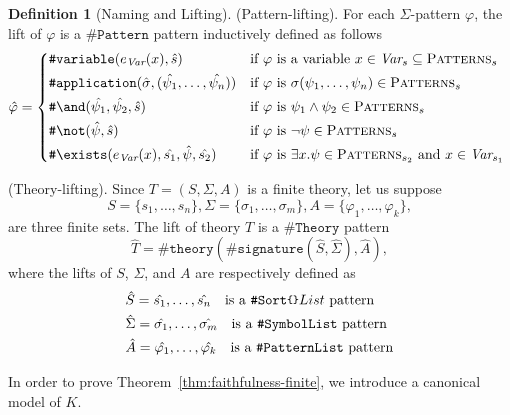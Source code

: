 \documentclass[UTF8,11pt]{article}
\newcounter{thmcounter}
\theoremstyle{plain}
\theoremstyle{definition}
\newtheorem{definition} [thmcounter]{Definition}
\theoremstyle{remark}
\newcommand{\parametric}[2]{{#1}\raisebox{.2ex}{\texttt{\footnotesize{\{}}}#2\raisebox{.2ex}{\texttt{\footnotesize{\}}}}}
\newcommand{\PATTERNS}{\text{P\textsc{atterns}}}
\newcommand{\sharpsymbol}{\#}
\newcommand{\KSort}{\texttt{\sharpsymbol Sort}}
\newcommand{\KPatternList}{\texttt{\sharpsymbol PatternList}}
\newcommand{\KSymbolList}{\texttt{\sharpsymbol SymbolList}}
\newcommand{\KPattern}{\texttt{\sharpsymbol Pattern}}
\newcommand{\Kvariable}{\texttt{\sharpsymbol variable}}
\newcommand{\Kand}{\texttt{\sharpsymbol  \slashsymbol and}}
\newcommand{\Knot}{\texttt{\sharpsymbol  \slashsymbol not}}
\newcommand{\Kapplication}{\texttt{\sharpsymbol application}}
\newcommand{\Kexists}{\texttt{\sharpsymbol \slashsymbol  exists}}
\newcommand{\Ksignature}{\texttt{\sharpsymbol signature}}
\newcommand{\KTheory}{\texttt{\sharpsymbol Theory}}
\newcommand{\Ktheory}{\texttt{\sharpsymbol theory}}
\newcommand{\slashsymbol}{\symbol{92}}
\begin{document}
\begin{definition}[Naming and Lifting]
	(Pattern-lifting).
	For each $\Sigma$-pattern $\varphi$, the lift of $\varphi$ is a $\KPattern$ 
	pattern inductively defined as follows
	\begin{equation*}
	\hat{\varphi} =
	\begin{cases*}
	\Kvariable(e_\Var(x), \hat{s}) & if $\varphi$ is a variable $x \in \Var_s 
	\subseteq \PATTERNS_s$
	\\
	\Kapplication(\hat{\sigma}, (\hat{\psi_1}, \dots, \hat{\psi_n})) & if 
	$\varphi$ is $\sigma(\psi_1,\dots,\psi_n) \in \PATTERNS_s$
	\\
	\Kand(\hat{\psi_1}, \hat{\psi_2}, \hat{s}) & if $\varphi$ is $\psi_1 \wedge 
	\psi_2 \in \PATTERNS_s$
	\\
	\Knot(\hat{\psi}, \hat{s}) & if $\varphi$ is $\neg \psi \in \PATTERNS_s$
	\\
	\Kexists(e_\Var(x), \hat{s_1}, \hat{\psi}, \hat{s_2}) & if $\varphi$ is 
	$\exists x . \psi \in \PATTERNS_{s_2}$ and $x \in \Var_{s_1}$
	\end{cases*}
	\end{equation*}
	
	(Theory-lifting). Since $T = (S, \Sigma, A)$ is a finite theory, let us 
	suppose
	\begin{equation*}
	S = \{ s_1, \dots, s_n \}, 
	\Sigma = \{ \sigma_1, \dots, \sigma_m \}, 
	A = \{ \varphi_1, \dots, \varphi_k \},
	\end{equation*}
	are three finite sets. The lift of theory $T$ is a $\KTheory$ pattern 
	$$ \hat{T} = \Ktheory(\Ksignature(\hat{S}, \hat{\Sigma}), \hat{A}),$$
	where the lifts of $S$, $\Sigma$, and $A$ are respectively defined as
	\begin{align*}
	& \hat{S} = \hat{s_1},\dots,\hat{s_n} 
	\quad \text{is a $\parametric{\KSort}{}List$ pattern}
	\\
	& \hat{\Sigma} = \hat{\sigma_1},\dots,\hat{\sigma_m}
	\quad \text{is a $\KSymbolList$ pattern}
	\\
	& \hat{A} = \hat{\varphi_1}, \dots, \hat{\varphi_k}
	\quad \text{is a $\KPatternList$ pattern}
	\end{align*}
\end{definition}

In order to prove Theorem~\ref{thm:faithfulness-finite}, we introduce a 
canonical model of $K$.
\end{document}
